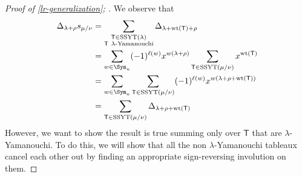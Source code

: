\documentclass[11pt,leqno,oneside]{amsart}
\numberwithin{thm}{section}
\newcommand{\T}{\mathsf{T}} %
\newcommand{\Vdet}{\Delta}
\newcommand{\rowshift}{\rho}
\newcommand{\SSYT}{\operatorname{SSYT}} %
\newcommand{\wt}{\operatorname{wt}}
\begin{document}
\begin{proof}[Proof of \ref{lr-generalization}; \cite{stembridge}]
  We observe that
  \begin{align*}
    \Vdet_{\lambda+\rho} s_{\mu/\nu}
    & = \sum_{\substack{\T \in \SSYT(\lambda) \\ \T\
    \lambda\text{-Yamanouchi}}} \Vdet_{\lambda+\wt(\T)+\rowshift}\\
    & = \sum_{w \in \Sym_n} (-1)^{\ell(w)} x^{w(\lambda+\rowshift)}
      \sum_{\T \in \SSYT(\mu/\nu)} x^{\wt(\T)}\\
    & = \sum_{w \in \Sym_n} \sum_{\T \in \SSYT(\mu/\nu)}
      (-1)^{\ell(w)} x^{w(\lambda+\rowshift+\wt(\T))}\\
    & = \sum_{\T \in \SSYT(\mu/\nu)} \Vdet_{\lambda+\rowshift+\wt(\T)}
  \end{align*}
  However, we want to show the result is true summing only over \(\T\)
  that are \(\lambda\)-Yamanouchi. To do this, we will show that all
  the non \(\lambda\)-Yamanouchi tableaux cancel each other out by
  finding an appropriate sign-reversing involution on them.


\end{proof}
\end{document}
